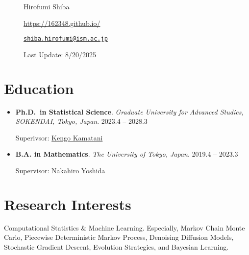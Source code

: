 \documentclass[
  11pt,
]{article}
\date{}
\renewcommand{\labelitemi}{\textcolor{minty}{\faCheckCircle}} %
\begin{document}
\begin{figure}

\begin{minipage}{0.50\linewidth}
\Huge Hirofumi Shiba\end{minipage}%
%
\begin{minipage}{0.50\linewidth}

\color{minty}

\hfill {} \url{https://162348.github.io/}

\par

\hfill {}
\href{mailto:shiba.hirofumi@ism.ac.jp}{\nolinkurl{shiba.hirofumi@ism.ac.jp}}

\par

\color{gray}\hfill {Last Update: 8/20/2025}\end{minipage}%

\end{figure}%

\vspace{-1em}

\section{Education}\label{education}

\renewcommand{\labelitemi}{\textcolor{minty}{\faGraduationCap}}

\begin{itemize}
\item
  \textbf{Ph.D.~in Statistical Science}. \emph{Graduate University for
  Advanced Studies, SOKENDAI, Tokyo, Japan}. \hfill {2023.4 -- 2028.3}

  Superivsor:
  \href{https://sites.google.com/view/kengokamatani/home}{Kengo
  Kamatani}
\item
  \textbf{B.A. in Mathematics}. \emph{The University of Tokyo, Japan}.
  \hfill {2019.4 -- 2023.3}

  Supervisor:
  \href{https://www.ms.u-tokyo.ac.jp/~nakahiro/hp-naka-e}{Nakahiro
  Yoshida}
\end{itemize}

\section{Research Interests}\label{research-interests}

Computational Statistics \& Machine Learning. Especially, Markov Chain
Monte Carlo, Piecewise Deterministic Markov Process, Denoising Diffusion
Models, Stochastic Gradient Descent, Evolution Strategies, and Bayesian
Learning.
\end{document}

